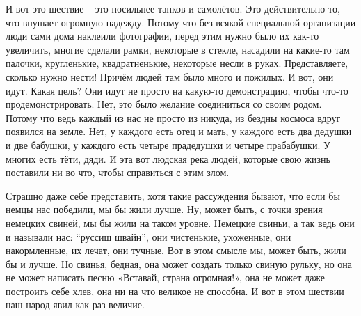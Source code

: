 И вот это шествие – это посильнее танков и самолётов. Это действительно то, что
внушает огромную надежду. Потому что без всякой специальной организации люди
сами дома наклеили фотографии, перед этим нужно было их как-то увеличить,
многие сделали рамки, некоторые в стекле, насадили на какие-то там палочки,
кругленькие, квадратненькие, некоторые несли в руках. Представляете, сколько
нужно нести! Причём людей там было много и пожилых. И вот, они идут. Какая
цель? Они идут не просто на какую-то демонстрацию, чтобы что-то
продемонстрировать. Нет, это было желание соединиться со своим родом. Потому
что ведь каждый из нас не просто из никуда, из бездны космоса вдруг появился на
земле. Нет, у каждого есть отец и мать, у каждого есть два дедушки и две
бабушки, у каждого есть четыре прадедушки и четыре прабабушки. У многих есть
тёти, дяди. И эта вот людская река людей, которые свою жизнь поставили ни во
что, чтобы справиться с этим злом. 
 
Страшно даже себе представить, хотя такие рассуждения бывают, что если бы немцы
нас победили, мы бы жили лучше. Ну, может быть, с точки зрения немецких свиней,
мы бы жили на таком уровне. Немецкие свиньи, а так ведь они и называли нас:
“руссиш швайн”, они чистенькие, ухоженные, они накормленные, их лечат, они
тучные. Вот в этом смысле мы, может быть, жили бы и лучше. Но свинья, бедная,
она может создать только свиную рульку, но она не может написать песню
«Вставай, страна огромная!», она не может даже построить себе хлев, она ни на
что великое не способна. И вот в этом шествии наш народ явил как раз величие. 
 
